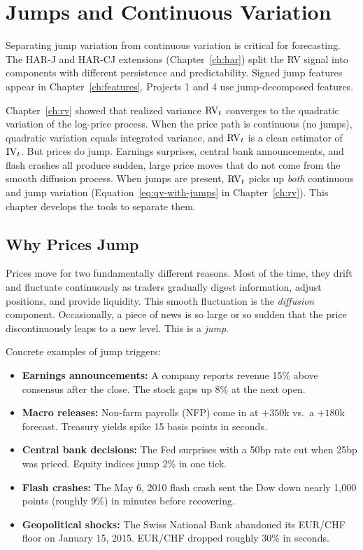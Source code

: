 \chapter{Jumps and Continuous Variation} 
\label{ch:jumps}

\begin{application}
Separating jump variation from continuous variation is critical for forecasting.
The HAR-J and HAR-CJ extensions (Chapter~\ref{ch:har}) split the RV signal into components with different persistence and predictability.
Signed jump features appear in Chapter~\ref{ch:features}.
Projects 1 and 4 use jump-decomposed features.
\end{application}

Chapter~\ref{ch:rv} showed that realized variance $\operatorname{RV}_t$ converges to the quadratic variation of the log-price process.
When the price path is continuous (no jumps), quadratic variation equals integrated variance, and $\operatorname{RV}_t$ is a clean estimator of $\operatorname{IV}_t$.
But prices do jump.
Earnings surprises, central bank announcements, and flash crashes all produce sudden, large price moves that do not come from the smooth diffusion process.
When jumps are present, $\operatorname{RV}_t$ picks up \emph{both} continuous and jump variation (Equation~\ref{eq:qv-with-jumps} in Chapter~\ref{ch:rv}).
This chapter develops the tools to separate them.


\section{Why Prices Jump}
\label{sec:why-jumps}

Prices move for two fundamentally different reasons.
Most of the time, they drift and fluctuate continuously as traders gradually digest information, adjust positions, and provide liquidity.
This smooth fluctuation is the \emph{diffusion} component.
Occasionally, a piece of news is so large or so sudden that the price discontinuously leaps to a new level.
This is a \emph{jump}.

Concrete examples of jump triggers:
\begin{itemize}[nosep]
  \item \textbf{Earnings announcements:} A company reports revenue 15\% above consensus after the close. The stock gaps up 8\% at the next open.
  \item \textbf{Macro releases:} Non-farm payrolls (NFP) come in at $+350$k vs.\ a $+180$k forecast. Treasury yields spike 15 basis points in seconds.
  \item \textbf{Central bank decisions:} The Fed surprises with a 50bp rate cut when 25bp was priced. Equity indices jump 2\% in one tick.
  \item \textbf{Flash crashes:} The May 6, 2010 flash crash sent the Dow down nearly 1,000 points (roughly 9\%) in minutes before recovering.
  \item \textbf{Geopolitical shocks:} The Swiss National Bank abandoned its EUR/CHF floor on January 15, 2015. EUR/CHF dropped roughly 30\% in seconds.
\end{itemize}

